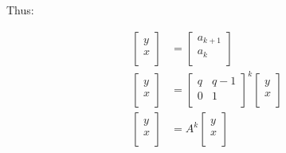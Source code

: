 \documentclass[paper.tex]{subfiles}
\begin{document}
Thus:

\begin{align*}
\left[ \begin{array}{ccc}
y \\
x \\
\end{array} \right]
&=
\left[ \begin{array}{ccc}
a_{k+1} \\
a_{k} \\
\end{array} \right] \\
\left[ \begin{array}{ccc}
y \\
x \\
\end{array} \right]
&=
\left[ \begin{array}{ccc}
q & q-1 \\
0 & 1 \\
\end{array} \right] ^{k}
\left[ \begin{array}{ccc}
y \\
x \\
\end{array} \right] \\
\left[ \begin{array}{ccc}
y \\
x \\
\end{array} \right]
&=
A^{k}
\left[ \begin{array}{ccc}
y \\
x \\
\end{array} \right] \\
\end{align*}
\end{document}
